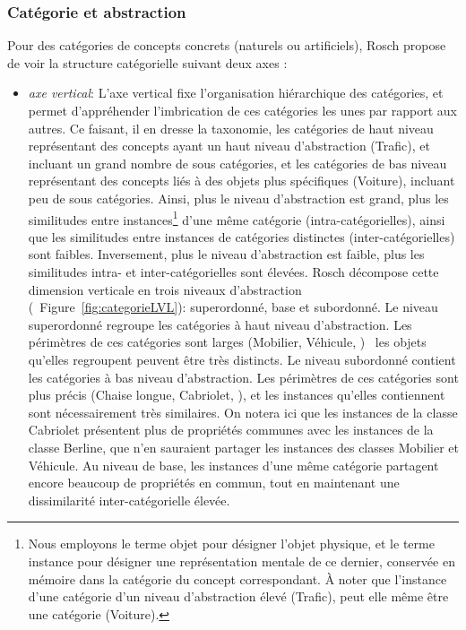 \subsubsection{Catégorie et abstraction}
 \label{sec:ch3_categoEtAbstract}
 
Pour des catégories de concepts concrets (naturels ou artificiels), Rosch propose de voir la structure catégorielle suivant deux axes \citep[p. 30-41]{rosch1978cognition}:

\begin{itemize}
\item \textit{axe vertical}: L'axe vertical fixe l'organisation hiérarchique des catégories, et permet d'appréhender l'imbrication de ces catégories les unes par rapport aux autres. Ce faisant, il en dresse la taxonomie, les catégories de haut niveau représentant des concepts ayant un haut niveau d'abstraction (Trafic), et incluant un grand nombre de sous catégories, et les catégories de bas niveau représentant des concepts liés à des objets plus spécifiques (Voiture), incluant peu de sous catégories. Ainsi, plus le niveau d'abstraction est grand, plus les similitudes entre instances\footnote{Nous employons le terme objet pour désigner l'objet physique, et le terme instance pour désigner une représentation mentale de ce dernier, conservée en mémoire dans la catégorie du concept correspondant. À noter que l'instance d'une catégorie d'un niveau d'abstraction élevé (Trafic), peut elle même être une catégorie (Voiture).} d'une même catégorie (intra-catégorielles), ainsi que les similitudes entre instances de catégories distinctes (inter-catégorielles) sont faibles. Inversement, plus le niveau d'abstraction est faible, plus les similitudes intra- et inter-catégorielles sont élevées. Rosch décompose cette dimension verticale en trois niveaux d'abstraction (\cf~Figure~\ref{fig:categorieLVL}): superordonné, base et subordonné. Le niveau superordonné regroupe les catégories à haut niveau d'abstraction. Les périmètres de ces catégories sont larges (Mobilier, Véhicule, \etc) \ie~les objets qu'elles regroupent peuvent être très distincts. Le niveau subordonné contient les catégories à bas niveau d'abstraction. Les périmètres de ces catégories sont plus précis (Chaise longue, Cabriolet, \etc), et les instances qu'elles contiennent sont nécessairement très similaires. On notera ici que les instances de la classe Cabriolet présentent plus de propriétés communes avec les instances de la classe Berline, que n'en sauraient partager les instances des classes Mobilier et Véhicule. Au niveau de base, les instances d'une même catégorie partagent encore beaucoup de propriétés en commun, tout en maintenant une dissimilarité inter-catégorielle élevée.

\end{itemize}
